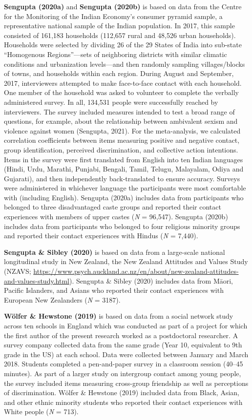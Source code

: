 \documentclass[12pt, letterpaper]{article}
\begin{document}
\textbf{Sengupta (2020a)} and \textbf{Sengupta (2020b)} is based on data
from the Centre for the Monitoring of the Indian Economy's consumer
pyramid sample, a representative national sample of the Indian
population. In 2017, this sample consisted of 161,183 households
(112,657 rural and 48,526 urban households). Households were selected by
dividing 26 of the 29 States of India into sub-state ``Homogenous
Regions''---sets of neighboring districts with similar climatic
conditions and urbanization levels---and then randomly sampling
villages/blocks of towns, and households within each region. During
August and September, 2017, interviewers attempted to make face-to-face
contact with each household. One member of the household was asked to
volunteer to complete the verbally administered survey. In all, 134,531
people were successfully reached by interviewers. The survey included
measures intended to test a broad range of questions, for example, about
the relationship between ambivalent sexism and violence against women
(Sengupta, 2021). For the meta-analysis, we calculated correlation
coefficients between items measuring positive and negative contact,
group identification, perceived discrimination, and collective action
intentions. Items in the survey were first translated from English into
ten Indian languages (Hindi, Urdu, Marathi, Punjabi, Bengali, Tamil,
Telugu, Malayalam, Odiya and Gujarati), and then independently
back-translated to ensure accuracy. Surveys were administered in
whichever language the participants were most comfortable with
(including English). Sengupta (2020a) includes data from participants
who belonged to three disadvantaged caste groups and reported their
contact experiences with members of upper castes (\emph{N} = 96,547).
Sengupta (2020b) includes data from participants who belonged to four
religious minority groups and reported their contact experiences with
Hindus (\emph{N} = 7,440).

\textbf{Sengupta \& Sibley (2020)} is based on data from a large-scale
national longitudinal study in New Zealand, the New Zealand Attitudes
and Values Study (NZAVS;
\url{https://www.psych.auckland.ac.nz/en/about/new-zealand-attitudes-and-values-study.html}).
Sengupta \& Sibley (2020) includes data from Māori, Pacific Islanders,
and Asians who reported their contact experiences with European New
Zealanders (\emph{N} = 3187).

\textbf{Wölfer \& Hewstone (2019)} is based on data from a social
network study across ten schools in England which was conducted as part
of a project for which the first author of the present research worked
as a postdoctoral researcher. A survey company collected data from the
same grade (Year 10, equivalent to 9th grade in the US) at each school.
Data were collected between January and March 2018. Students completed a
pen-and-paper survey in a classroom session (40--45 minutes). As part of
a larger study on intergroup contact among young people, the survey
included items measuring cross-group friendship as well as perceptions
of discrimination. Wölfer \& Hewstone (2019) included data from Black,
Asian, and other ethnic minority students who reported their contact
experiences with White people (\emph{N} = 713).
\end{document}
